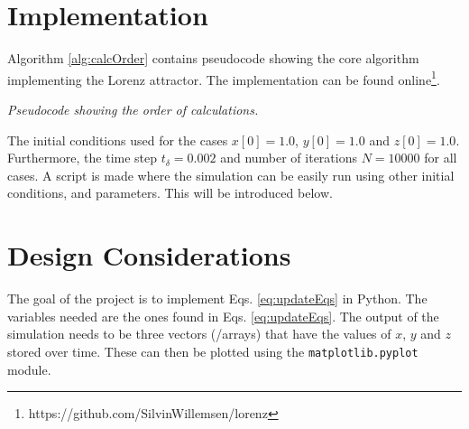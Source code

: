 \documentclass{article}
\def\td{t_\delta}
\def\code#1{\texttt{#1}}
\begin{document}
\section{Implementation}
Algorithm \ref{alg:calcOrder} contains pseudocode showing the core algorithm implementing the Lorenz attractor. The implementation can be found online\footnote{https://github.com/SilvinWillemsen/lorenz}.

\begin{algorithm}[ht]
    \vspace{0.12cm}
    \caption{\it Pseudocode showing the order of calculations.\label{alg:calcOrder}}
\end{algorithm}

The initial conditions used for the cases $x[0] = 1.0$, $y[0] = 1.0$ and $z[0] = 1.0$. Furthermore, the time step $\td = 0.002$ and number of iterations $N = 10000$ for all cases. A script is made where the simulation can be easily run using other initial conditions, and parameters. This will be introduced below.

\section{Design Considerations}
The goal of the project is to implement Eqs. \eqref{eq:updateEqs} in Python. The variables needed are the ones found in Eqs. \eqref{eq:updateEqs}. The output of the simulation needs to be three vectors (/arrays) that have the values of $x$, $y$ and $z$ stored over time. These can then be plotted using the \code{matplotlib.pyplot} module.
\end{document}
